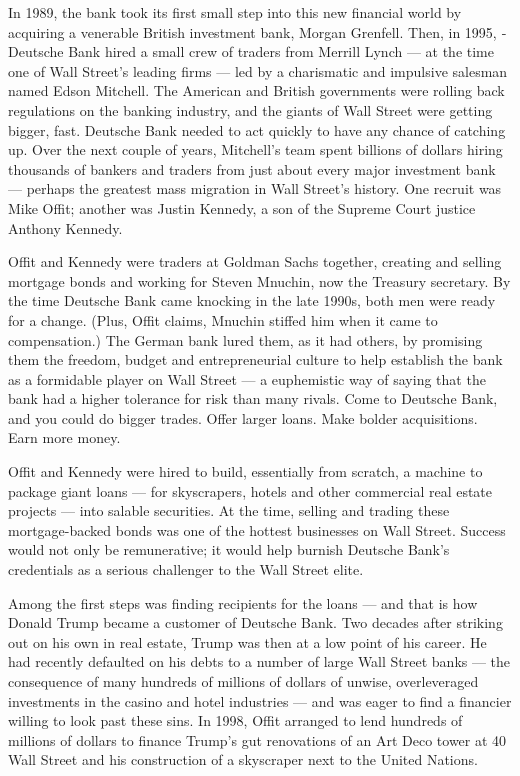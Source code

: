 In 1989, the bank took its first small step into this new financial
world by acquiring a venerable British investment bank, Morgan Grenfell.
Then, in 1995, ­Deutsche Bank hired a small crew of traders from Merrill
Lynch --- at the time one of Wall Street's leading firms --- led by a
charismatic and impulsive salesman named Edson Mitchell. The American
and British governments were rolling back regulations on the banking
industry, and the giants of Wall Street were getting bigger, fast.
­Deutsche Bank needed to act quickly to have any chance of catching up.
Over the next couple of years, Mitchell's team spent billions of dollars
hiring thousands of bankers and traders from just about every major
investment bank --- perhaps the greatest mass migration in Wall Street's
history. One recruit was Mike Offit; another was Justin Kennedy, a son
of the Supreme Court justice Anthony Kennedy.

Offit and Kennedy were traders at Goldman Sachs together, creating and
selling mortgage bonds and working for Steven Mnuchin, now the Treasury
secretary. By the time ­Deutsche Bank came knocking in the late 1990s,
both men were ready for a change. (Plus, Offit claims, Mnuchin stiffed
him when it came to compensation.) The German bank lured them, as it had
others, by promising them the freedom, budget and entrepreneurial
culture to help establish the bank as a formidable player on Wall Street
--- a euphemistic way of saying that the bank had a higher tolerance for
risk than many rivals. Come to ­Deutsche Bank, and you could do bigger
trades. Offer larger loans. Make bolder acquisitions. Earn more money.

Offit and Kennedy were hired to build, essentially from scratch, a
machine to package giant loans --- for skyscrapers, hotels and other
commercial real estate projects --- into salable securities. At the
time, selling and trading these mortgage-­backed bonds was one of the
hottest businesses on Wall Street. Success would not only be
remunerative; it would help burnish ­Deutsche Bank's credentials as a
serious challenger to the Wall Street elite.

Among the first steps was finding recipients for the loans --- and that
is how Donald Trump became a customer of ­Deutsche Bank. Two decades
after striking out on his own in real estate, Trump was then at a low
point of his career. He had recently defaulted on his debts to a number
of large Wall Street banks --- the consequence of many hundreds of
millions of dollars of unwise, overleveraged investments in the casino
and hotel industries --- and was eager to find a financier willing to
look past these sins. In 1998, Offit arranged to lend hundreds of
millions of dollars to finance Trump's gut renovations of an Art Deco
tower at 40 Wall Street and his construction of a skyscraper next to the
United Nations.

